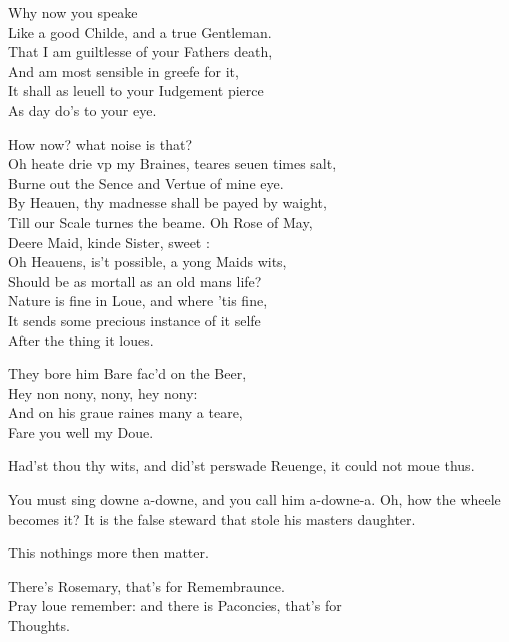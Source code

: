 \documentclass[a5paper,DIV=calc,11pt]{scrbook}
\begin{document}
\begin{drama*}
    \kingspeaks Why now you speake\\
    Like a good Childe, and a true Gentleman.\\
    That I am guiltlesse of your Fathers death,\\
    And am most sensible in greefe for it,\\
    It shall as leuell to your Iudgement pierce\\
    As day do's to your eye.
    
    
    
    \laerspeaks How now? what noise is that?\\
    Oh heate drie vp my Braines, teares seuen times salt,\\
    Burne out the Sence and Vertue of mine eye.\\
    By Heauen, thy madnesse shall be payed by waight,\\
    Till our Scale turnes the beame. Oh Rose of May,\\
    Deere Maid, kinde Sister, sweet \ophe:\\
    Oh Heauens, is't possible, a yong Maids wits,\\
    Should be as mortall as an old mans life?\\
    Nature is fine in Loue, and where 'tis fine,\\
    It sends some precious instance of it selfe\\
    After the thing it loues.
    
    \ophespeaks \hspace{2em}\parbox{20em}{They bore him Bare fac'd on the Beer,\\
    Hey non nony, nony, hey nony:\\
    And on his graue raines many a teare,\\
    Fare you well my Doue.}
    
    \laerspeaks Had'st thou thy wits, and did'st perswade Reuenge, it could not moue thus.
    
    \ophespeaks You must sing downe a-downe, and you call him a-downe-a. Oh, how the wheele becomes it? It is the false steward that stole his masters daughter.
    
    \laerspeaks This nothings more then matter.
    
    \ophespeaks There's Rosemary, that's for Remembraunce.\\
    Pray loue remember: and there is Paconcies, that's for\\
    Thoughts.
    

\end{drama*}
\end{document}

